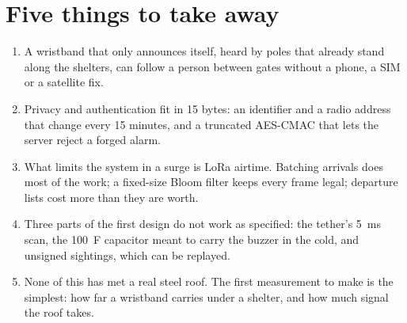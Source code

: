 \documentclass[11pt,a4paper,twoside,openany]{book}
\begin{document}
\section*{Five things to take away}
\begin{enumerate}
\item A wristband that only announces itself, heard by poles that already stand along the shelters, can follow a person
between gates without a phone, a SIM or a satellite fix.
\item Privacy and authentication fit in 15 bytes: an identifier and a radio address that change every 15 minutes, and a
truncated AES-CMAC that lets the server reject a forged alarm.
\item What limits the system in a surge is LoRa airtime. Batching arrivals does most of the work; a fixed-size Bloom
filter keeps every frame legal; departure lists cost more than they are worth.
\item Three parts of the first design do not work as specified: the tether's 5~ms scan, the 100~\textmu F capacitor
meant to carry the buzzer in the cold, and unsigned sightings, which can be replayed.
\item None of this has met a real steel roof. The first measurement to make is the simplest: how far a wristband
carries under a shelter, and how much signal the roof takes.
\end{enumerate}
\end{document}
